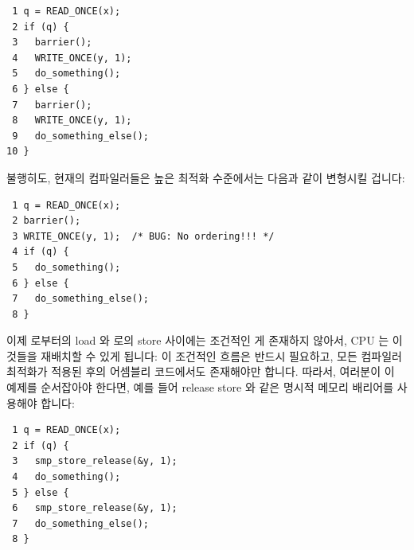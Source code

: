 \begin{enumerate}
\vspace{5pt}
\begin{minipage}[t]{\columnwidth}
\scriptsize
\begin{verbatim}
 1 q = READ_ONCE(x);
 2 if (q) {
 3   barrier();
 4   WRITE_ONCE(y, 1);
 5   do_something();
 6 } else {
 7   barrier();
 8   WRITE_ONCE(y, 1);
 9   do_something_else();
10 }
\end{verbatim}
\end{minipage}
\vspace{5pt}

불행히도, 현재의 컴파일러들은 높은 최적화 수준에서는 다음과 같이 변형시킬
겁니다:

\vspace{5pt}
\begin{minipage}[t]{\columnwidth}
\scriptsize
\begin{verbatim}
 1 q = READ_ONCE(x);
 2 barrier();
 3 WRITE_ONCE(y, 1);  /* BUG: No ordering!!! */
 4 if (q) {
 5   do_something();
 6 } else {
 7   do_something_else();
 8 }
\end{verbatim}
\end{minipage}
\vspace{5pt}

이제  로부터의 load 와  로의 store 사이에는 조건적인 게 존재하지
않아서, CPU 는 이것들을 재배치할 수 있게 됩니다:
이 조건적인 흐름은 반드시 필요하고, 모든 컴파일러 최적화가 적용된 후의 어셈블리
코드에서도 존재해야만 합니다.
따라서, 여러분이 이 예제를 순서잡아야 한다면, 예를 들어 release store 와 같은
명시적 메모리 배리어를 사용해야 합니다:

\vspace{5pt}
\begin{minipage}[t]{\columnwidth}
\scriptsize
\begin{verbatim}
 1 q = READ_ONCE(x);
 2 if (q) {
 3   smp_store_release(&y, 1);
 4   do_something();
 5 } else {
 6   smp_store_release(&y, 1);
 7   do_something_else();
 8 }
\end{verbatim}
\end{minipage}
\vspace{5pt}


\end{enumerate}
